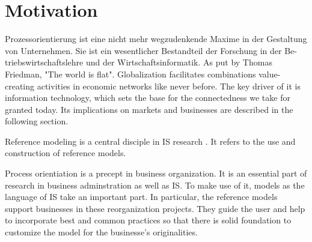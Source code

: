 \chapter{Motivation}

Prozessorientierung ist eine nicht mehr wegzudenkende Maxime in der Gestaltung von Unternehmen. Sie ist ein wesentlicher Bestandteil der Forschung in der Be- triebswirtschaftslehre und der Wirtschaftsinformatik.
As put by Thomas Friedman, "The world is flat". Globalization facilitates combinations value-creating activities in economic networks like never before. The key driver of it is information technology, which sets the base for the connectedness we take for granted today. Its implications on markets and businesses are described in the following section. 

Reference modeling is a central disciple in IS research \cite{Fettke2004, konig1996entwicklung, becker2004handelsinformationssysteme}. It refers to the use and construction of reference models.


Process orientiation is a precept in business organization. It is an essential part of research in business adminstration as well as \acrfull{IS}. To make use of it, models as the language of \acrshort{IS} take an important part. In particular, the reference models support businesses in these reorganization projects. They guide the user and help to incorporate best and common practices so that there is solid foundation to customize the model for the businesse's originalities.  

